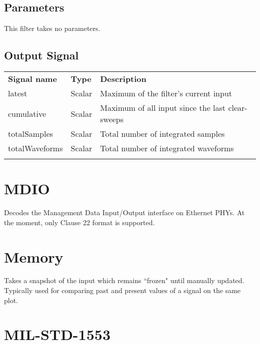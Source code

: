 \subsection{Parameters}

This filter takes no parameters.

\subsection{Output Signal}

\begin{tabularx}{16cm}{llX}
\thickhline
\textbf{Signal name} & \textbf{Type} & \textbf{Description} \\
\thickhline
latest & Scalar & Maximum of the filter's current input \\
\thinhline
cumulative & Scalar & Maximum of all input since the last clear-sweeps\\
\thinhline
totalSamples & Scalar & Total number of integrated samples \\
\thinhline
totalWaveforms & Scalar & Total number of integrated waveforms \\
\thickhline
\end{tabularx}

\pagebreak
\section{MDIO}

Decodes the Management Data Input/Output interface on Ethernet PHYs. At the moment, only Clause 22 format is supported.

\pagebreak
\section{Memory}

Takes a snapshot of the input which remains ``frozen" until manually updated. Typically used for comparing past and
present values of a signal on the same plot.

\pagebreak
\section{MIL-STD-1553}

